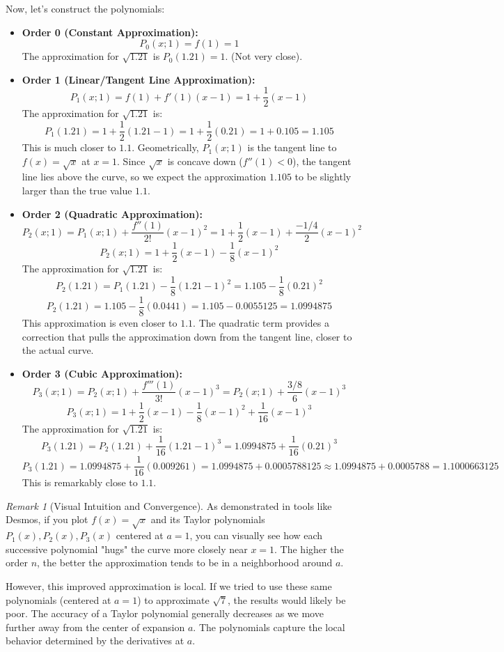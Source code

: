 \documentclass[11pt]{article}
\theoremstyle{definition}
\theoremstyle{remark}
\newtheorem{remark}[theorem]{Remark}
\begin{document}
Now, let's construct the polynomials:
\begin{itemize}
    \item \textbf{Order 0 (Constant Approximation):}
      \[ P_0(x; 1) = f(1) = 1 \]
      The approximation for $\sqrt{1.21}$ is $P_0(1.21) = 1$. (Not very close).

    \item \textbf{Order 1 (Linear/Tangent Line Approximation):}
      \[ P_1(x; 1) = f(1) + f'(1)(x-1) = 1 + \frac{1}{2}(x-1) \]
      The approximation for $\sqrt{1.21}$ is:
      \[ P_1(1.21) = 1 + \frac{1}{2}(1.21 - 1) = 1 + \frac{1}{2}(0.21) = 1 + 0.105 = 1.105 \]
      This is much closer to $1.1$. Geometrically, $P_1(x; 1)$ is the tangent line to $f(x)=\sqrt{x}$ at $x=1$. Since $\sqrt{x}$ is concave down ($f''(1) < 0$), the tangent line lies above the curve, so we expect the approximation $1.105$ to be slightly larger than the true value $1.1$.

    \item \textbf{Order 2 (Quadratic Approximation):}
      \[ P_2(x; 1) = P_1(x; 1) + \frac{f''(1)}{2!}(x-1)^2 = 1 + \frac{1}{2}(x-1) + \frac{-1/4}{2}(x-1)^2 \]
      \[ P_2(x; 1) = 1 + \frac{1}{2}(x-1) - \frac{1}{8}(x-1)^2 \]
      The approximation for $\sqrt{1.21}$ is:
      \[ P_2(1.21) = P_1(1.21) - \frac{1}{8}(1.21 - 1)^2 = 1.105 - \frac{1}{8}(0.21)^2 \]
      \[ P_2(1.21) = 1.105 - \frac{1}{8}(0.0441) = 1.105 - 0.0055125 = 1.0994875 \]
      This approximation is even closer to $1.1$. The quadratic term provides a correction that pulls the approximation down from the tangent line, closer to the actual curve.

    \item \textbf{Order 3 (Cubic Approximation):}
      \[ P_3(x; 1) = P_2(x; 1) + \frac{f'''(1)}{3!}(x-1)^3 = P_2(x; 1) + \frac{3/8}{6}(x-1)^3 \]
      \[ P_3(x; 1) = 1 + \frac{1}{2}(x-1) - \frac{1}{8}(x-1)^2 + \frac{1}{16}(x-1)^3 \]
      The approximation for $\sqrt{1.21}$ is:
      \[ P_3(1.21) = P_2(1.21) + \frac{1}{16}(1.21 - 1)^3 = 1.0994875 + \frac{1}{16}(0.21)^3 \]
      \[ P_3(1.21) = 1.0994875 + \frac{1}{16}(0.009261) = 1.0994875 + 0.0005788125 \approx 1.0994875 + 0.0005788 = 1.1000663125 \]
      This is remarkably close to $1.1$.
\end{itemize}

\begin{remark}[Visual Intuition and Convergence]
As demonstrated in tools like Desmos, if you plot $f(x)=\sqrt{x}$ and its Taylor polynomials $P_1(x), P_2(x), P_3(x)$ centered at $a=1$, you can visually see how each successive polynomial "hugs" the curve more closely near $x=1$. The higher the order $n$, the better the approximation tends to be in a neighborhood around $a$.

However, this improved approximation is local. If we tried to use these same polynomials (centered at $a=1$) to approximate $\sqrt{7}$, the results would likely be poor. The accuracy of a Taylor polynomial generally decreases as we move further away from the center of expansion $a$. The polynomials capture the local behavior determined by the derivatives at $a$.
\end{remark}
\end{document}
